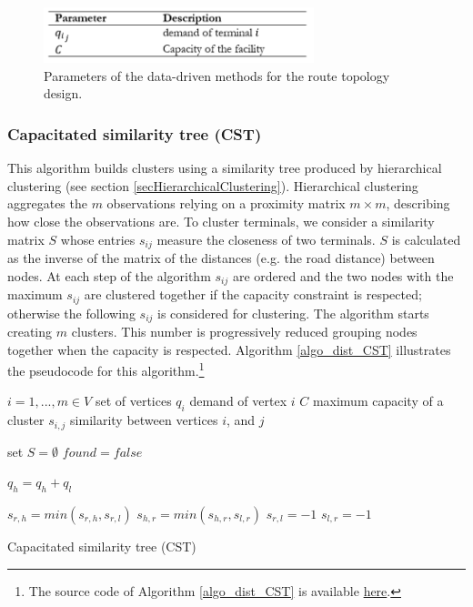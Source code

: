 \begin{figure}[hbt!]
\centering
\includegraphics[width=0.7\textwidth]{SectionDistribution/design_figures/tab_nodeClustering.png}
\captionsetup{type=table}
\caption{Parameters of the data-driven methods for the route topology design.}
\label{tab_nodeClustering}
\end{figure}

\subsubsection{Capacitated similarity tree (CST)}
This algorithm builds clusters using a similarity tree produced by hierarchical clustering (see section \ref{secHierarchicalClustering}). Hierarchical clustering aggregates the $m$ observations relying on a proximity matrix $m \times m$, describing how close the observations are. To cluster terminals, we consider a similarity matrix $S$ whose entries $s_{ij}$ measure the closeness of two terminals. $S$ is calculated as the inverse of the matrix of the distances (e.g. the road distance) between nodes. At each step of the algorithm $s_{ij}$ are ordered and the two nodes with the maximum $s_{ij}$ are clustered together if the capacity constraint is respected; otherwise the following $s_{ij}$ is considered for clustering. The algorithm starts creating $m$ clusters. This number is progressively reduced grouping nodes together when the capacity is respected. Algorithm \ref{algo_dist_CST} illustrates the pseudocode for this algorithm.\footnote{The source code of Algorithm \ref{algo_dist_CST} is available \href{https://github.com/aletuf93/logproj/blob/master/logproj/ml_unsupervised_models.py}{here}.} 

\begin{algorithm}[H]
\DontPrintSemicolon
\SetAlgoLined

$i = 1,...,m \in V$ set of vertices\;
$q_i$ demand of vertex $i$\;
$C$ maximum capacity of a cluster \;
$s_{i,j}$ similarity between vertices $i$, and $j$ \;
{
set $S=\emptyset$\;
$found=false$\;

$q_h=q_h+q_l$\;
{
$s_{r,h}=min(s_{r,h},s_{r,l})$\;
$s_{h,r}=min(s_{h,r},s_{l,r})$\;
$s_{r,l}=-1$\;
$s_{l,r}=-1$\;

}
}

\caption{Capacitated similarity tree (CST)}
\label{algo_dist_CST}   
    

\end{algorithm}

